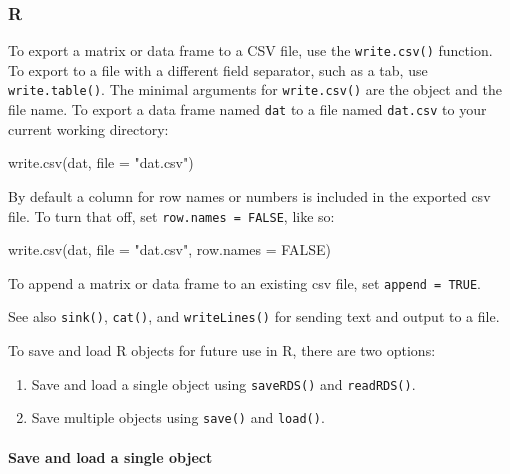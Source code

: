 \documentclass[
]{book}
\newenvironment{Shaded}{\begin{snugshade}}{\end{snugshade}}
\newcommand{\AttributeTok}[1]{\textcolor[rgb]{0.77,0.63,0.00}{#1}}
\newcommand{\ConstantTok}[1]{\textcolor[rgb]{0.00,0.00,0.00}{#1}}
\newcommand{\FunctionTok}[1]{\textcolor[rgb]{0.00,0.00,0.00}{#1}}
\newcommand{\NormalTok}[1]{#1}
\newcommand{\StringTok}[1]{\textcolor[rgb]{0.31,0.60,0.02}{#1}}
\providecommand{\tightlist}{%
  \setlength{\itemsep}{0pt}\setlength{\parskip}{0pt}}
\begin{document}
\hypertarget{r-16}{%
\subsubsection*{R}\label{r-16}}

To export a matrix or data frame to a CSV file, use the \texttt{write.csv()} function. To export to a file with a different field separator, such as a tab, use \texttt{write.table()}. The minimal arguments for \texttt{write.csv()} are the object and the file name. To export a data frame named \texttt{dat} to a file named \texttt{dat.csv} to your current working directory:

\begin{Shaded}
\begin{Highlighting}[]
\FunctionTok{write.csv}\NormalTok{(dat, }\AttributeTok{file =} \StringTok{"dat.csv"}\NormalTok{)}
\end{Highlighting}
\end{Shaded}

By default a column for row names or numbers is included in the exported csv file. To turn that off, set \texttt{row.names\ =\ FALSE}, like so:

\begin{Shaded}
\begin{Highlighting}[]
\FunctionTok{write.csv}\NormalTok{(dat, }\AttributeTok{file =} \StringTok{"dat.csv"}\NormalTok{, }\AttributeTok{row.names =} \ConstantTok{FALSE}\NormalTok{)}
\end{Highlighting}
\end{Shaded}

To append a matrix or data frame to an existing csv file, set \texttt{append\ =\ TRUE}.

See also \texttt{sink()}, \texttt{cat()}, and \texttt{writeLines()} for sending text and output to a file.

To save and load R objects for future use in R, there are two options:

\begin{enumerate}
\def\labelenumi{\arabic{enumi}.}
\tightlist
\item
  Save and load a single object using \texttt{saveRDS()} and \texttt{readRDS()}.
\item
  Save multiple objects using \texttt{save()} and \texttt{load()}.
\end{enumerate}

\hypertarget{save-and-load-a-single-object}{%
\paragraph*{Save and load a single object}\label{save-and-load-a-single-object}}
\end{document}
